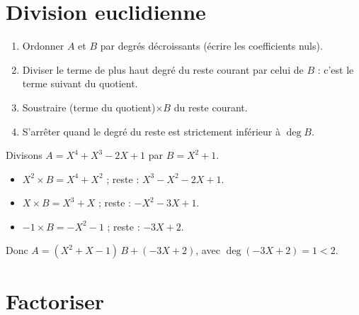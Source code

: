 
\section{Division euclidienne}

\begin{methode}
\begin{enumerate}[label=\textbf{Étape \arabic*.}]
  \item Ordonner $A$ et $B$ par degrés décroissants (écrire les coefficients nuls).
  \item Diviser le terme de plus haut degré du reste courant par celui de $B$ : c'est le terme suivant du quotient.
  \item Soustraire (terme du quotient)$\times B$ du reste courant.
  \item S'arrêter quand le degré du reste est strictement inférieur à $\deg B$.
\end{enumerate}
\end{methode}

\begin{exemple}
Divisons $A=X^4+X^3-2X+1$ par $B=X^2+1$.
\begin{itemize}
  \item $X^2\times B=X^4+X^2$ ; reste : $X^3-X^2-2X+1$.
  \item $X\times B=X^3+X$ ; reste : $-X^2-3X+1$.
  \item $-1\times B=-X^2-1$ ; reste : $-3X+2$.
\end{itemize}
Donc $A=(X^2+X-1)\,B+(-3X+2)$, avec $\deg(-3X+2)=1<2$.
\end{exemple}

\section{Factoriser}


